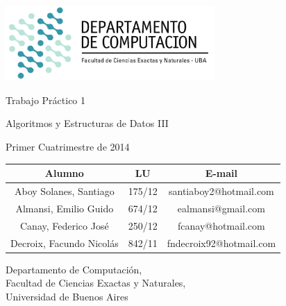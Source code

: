 \documentclass[a4paper, 10pt, twoside]{article}
\begin{document}

\thispagestyle{caratula}

\begin{center}

\includegraphics[width=0.6\textwidth]{./img/DC.jpg} 
\hfill

\vspace{2cm}

\begin{Huge}
Trabajo Práctico 1
\end{Huge}

\vspace{0.5cm}

\begin{Large}
Algoritmos y Estructuras de Datos III
\end{Large}

\vspace{1cm}

\begin{Large}
Primer Cuatrimestre de 2014
\end{Large}

\vspace{2cm}

\begin{tabular}{|c|c|c|}
\hline
Alumno & LU & E-mail\\
\hline
Aboy Solanes, Santiago    & 175/12 & santiaboy2@hotmail.com\\
Almansi, Emilio Guido     & 674/12 & ealmansi@gmail.com\\
Canay, Federico José      & 250/12 & fcanay@hotmail.com\\
Decroix, Facundo Nicolás  & 842/11 & fndecroix92@hotmail.com\\
\hline
\end{tabular}

\vspace{4cm}

Departamento de Computación,\\
Facultad de Ciencias Exactas y Naturales,\\
Universidad de Buenos Aires

\end{center}
\end{document}
